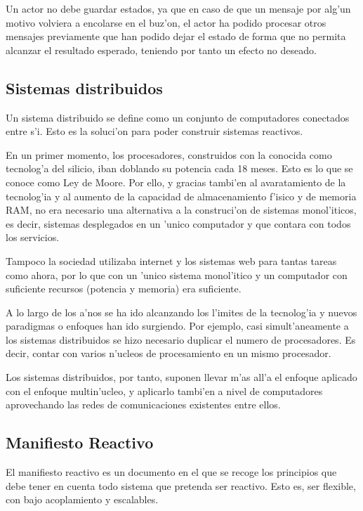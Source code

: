 \documentclass[12pt]{article}
\begin{document}
Un actor no debe guardar estados, ya que en caso de que un mensaje por alg'un motivo
volviera a encolarse en el buz'on, el actor ha podido procesar otros mensajes previamente
que han podido dejar el estado de forma que no permita alcanzar el resultado esperado, teniendo
por tanto un efecto no deseado.

\subsection{Sistemas distribuidos}
\label{sub:sistemas distribuidos}
Un sistema distribuido se define como un conjunto de computadores conectados entre s'i. Esto
es la soluci'on para poder construir sistemas reactivos.

En un primer momento, los procesadores, construidos con la conocida como tecnolog'a del
silicio, iban doblando su potencia cada 18 meses. Esto es lo que se conoce como Ley de Moore.
Por ello, y gracias tambi'en al avaratamiento de la tecnolog'ia y al aumento de la capacidad de
almacenamiento f'isico y de memoria RAM, no era necesario una alternativa a la construci'on de sistemas
monol'iticos, es decir, sistemas desplegados en un 'unico computador y que contara con
todos los servicios.

Tampoco la sociedad utilizaba internet y los sistemas web para tantas tareas como ahora, por lo
que con un 'unico sistema monol'itico y un computador con suficiente recursos (potencia y memoria)
era suficiente.

A lo largo de los a'nos se ha ido alcanzando los l'imites de la tecnolog'ia y nuevos paradigmas o
enfoques han ido surgiendo. Por ejemplo, casi simult'aneamente a los sistemas distribuidos se
hizo necesario duplicar el numero de procesadores. Es decir, contar con varios n'ucleos de
procesamiento en un mismo procesador.

Los sistemas distribuidos, por tanto, suponen llevar m'as all'a el enfoque aplicado con el enfoque
multin'ucleo, y aplicarlo tambi'en a nivel de computadores aprovechando las redes de comunicaciones
existentes entre ellos.

\subsection{Manifiesto Reactivo}
\label{sub:manifiesto reactivo}
El manifiesto reactivo es un documento en el que se recoge los principios que debe
tener en cuenta todo sistema que pretenda ser reactivo. Esto es, ser flexible, con bajo
acoplamiento y escalables.
\end{document}
